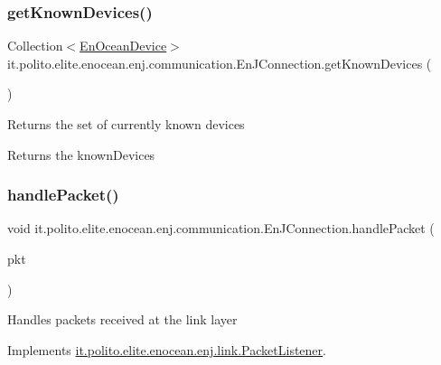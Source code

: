 \subsubsection{\texorpdfstring{get\+Known\+Devices()}{getKnownDevices()}}
{\footnotesize\ttfamily Collection$<$\hyperlink{classit_1_1polito_1_1elite_1_1enocean_1_1enj_1_1model_1_1_en_ocean_device}{En\+Ocean\+Device}$>$ it.\+polito.\+elite.\+enocean.\+enj.\+communication.\+En\+J\+Connection.\+get\+Known\+Devices (\begin{DoxyParamCaption}{ }\end{DoxyParamCaption})}

Returns the set of currently known devices

\begin{DoxyReturn}{Returns}
the known\+Devices 
\end{DoxyReturn}
\hypertarget{classit_1_1polito_1_1elite_1_1enocean_1_1enj_1_1communication_1_1_en_j_connection_ad182a8d74dda136f692a69c86d29cb09}{}\label{classit_1_1polito_1_1elite_1_1enocean_1_1enj_1_1communication_1_1_en_j_connection_ad182a8d74dda136f692a69c86d29cb09} 
\subsubsection{\texorpdfstring{handle\+Packet()}{handlePacket()}}
{\footnotesize\ttfamily void it.\+polito.\+elite.\+enocean.\+enj.\+communication.\+En\+J\+Connection.\+handle\+Packet (\begin{DoxyParamCaption}\item[{\hyperlink{classit_1_1polito_1_1elite_1_1enocean_1_1protocol_1_1serial_1_1v3_1_1network_1_1packet_1_1_e_s_p3_packet}{E\+S\+P3\+Packet}}]{pkt }\end{DoxyParamCaption})}

Handles packets received at the link layer 

Implements \hyperlink{interfaceit_1_1polito_1_1elite_1_1enocean_1_1enj_1_1link_1_1_packet_listener_a30b8942feaad919c75fc4cdf4d76dea6}{it.\+polito.\+elite.\+enocean.\+enj.\+link.\+Packet\+Listener}.

\hypertarget{classit_1_1polito_1_1elite_1_1enocean_1_1enj_1_1communication_1_1_en_j_connection_a3564e56e836696faed055d05a5f50292}{}\label{classit_1_1polito_1_1elite_1_1enocean_1_1enj_1_1communication_1_1_en_j_connection_a3564e56e836696faed055d05a5f50292} 
